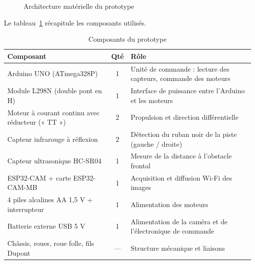 \begin{figure}[H]
{}
\caption{Architecture matérielle du prototype}
\label{fig:archi-materielle}
\end{figure}

Le tableau~\ref{tab:composants} récapitule les composants utilisés.

\begin{table}[H]
\centering\small
\caption{Composants du prototype}
\label{tab:composants}
\begin{tabularx}{\linewidth}{l c X}
\toprule
\textbf{Composant} & \textbf{Qté} & \textbf{Rôle} \\
\midrule
Arduino UNO (ATmega328P)          & 1 & Unité de commande : lecture des capteurs, commande des moteurs \\
Module L298N (double pont en H)   & 1 & Interface de puissance entre l'Arduino et les moteurs \\
Moteur à courant continu avec réducteur (« TT ») & 2 & Propulsion et direction différentielle \\
Capteur infrarouge à réflexion    & 2 & Détection du ruban noir de la piste (gauche / droite) \\
Capteur ultrasonique HC-SR04      & 1 & Mesure de la distance à l'obstacle frontal \\
ESP32-CAM + carte ESP32-CAM-MB    & 1 & Acquisition et diffusion Wi-Fi des images \\
4 piles alcalines AA 1,5 V + interrupteur & 1 & Alimentation des moteurs \\
Batterie externe USB 5 V          & 1 & Alimentation de la caméra et de l'électronique de commande \\
Châssis, roues, roue folle, fils Dupont & — & Structure mécanique et liaisons \\
\bottomrule
\end{tabularx}
\end{table}

